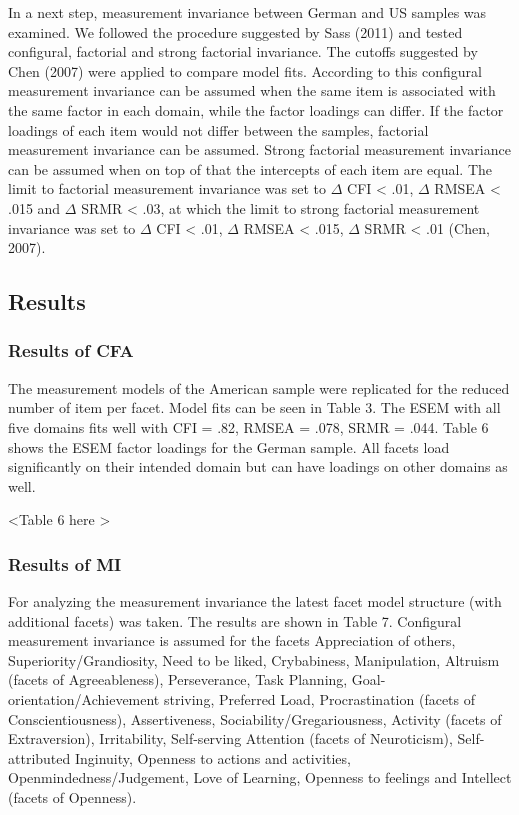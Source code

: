 \documentclass[,man,floatsintext]{apa6}
\theoremstyle{definition}
\theoremstyle{definition}
\theoremstyle{definition}
\theoremstyle{remark}
\begin{document}
In a next step, measurement invariance between German and US samples was
examined. We followed the procedure suggested by Sass (2011) and tested
configural, factorial and strong factorial invariance. The cutoffs
suggested by Chen (2007) were applied to compare model fits. According
to this configural measurement invariance can be assumed when the same
item is associated with the same factor in each domain, while the factor
loadings can differ. If the factor loadings of each item would not
differ between the samples, factorial measurement invariance can be
assumed. Strong factorial measurement invariance can be assumed when on
top of that the intercepts of each item are equal. The limit to
factorial measurement invariance was set to \(\Delta\) CFI \textless{}
.01, \(\Delta\) RMSEA \textless{} .015 and \(\Delta\) SRMR \textless{}
.03, at which the limit to strong factorial measurement invariance was
set to \(\Delta\) CFI \textless{} .01, \(\Delta\) RMSEA \textless{}
.015, \(\Delta\) SRMR \textless{} .01 (Chen, 2007).

\hypertarget{results-1}{%
\subsection{Results}\label{results-1}}

\hypertarget{results-of-cfa}{%
\subsubsection{Results of CFA}\label{results-of-cfa}}

The measurement models of the American sample were replicated for the
reduced number of item per facet. Model fits can be seen in Table 3. The
ESEM with all five domains fits well with CFI = .82, RMSEA = .078, SRMR
= .044. Table 6 shows the ESEM factor loadings for the German sample.
All facets load significantly on their intended domain but can have
loadings on other domains as well.

\textless{}Table 6 here \textgreater{}

\hypertarget{results-of-mi}{%
\subsubsection{Results of MI}\label{results-of-mi}}

For analyzing the measurement invariance the latest facet model
structure (with additional facets) was taken. The results are shown in
Table 7. Configural measurement invariance is assumed for the facets
Appreciation of others, Superiority/Grandiosity, Need to be liked,
Crybabiness, Manipulation, Altruism (facets of Agreeableness),
Perseverance, Task Planning, Goal-orientation/Achievement striving,
Preferred Load, Procrastination (facets of Conscientiousness),
Assertiveness, Sociability/Gregariousness, Activity (facets of
Extraversion), Irritability, Self-serving Attention (facets of
Neuroticism), Self-attributed Inginuity, Openness to actions and
activities, Openmindedness/Judgement, Love of Learning, Openness to
feelings and Intellect (facets of Openness).
\end{document}
